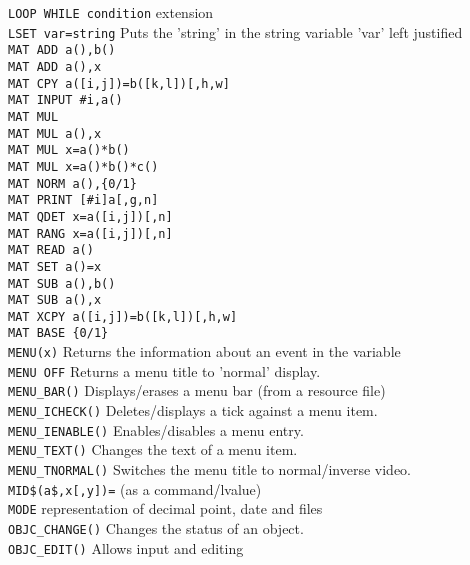 \begin{tabbing}
\verb|LOOP WHILE condition|\>     extension\\
\verb|LSET var=string|\>  Puts the 'string' in the string variable 'var' left justified\\
\verb|MAT ADD a(),b()|\>\\
\verb|MAT ADD a(),x|\>\\
\verb|MAT CPY a([i,j])=b([k,l])[,h,w]|\>\\
\verb|MAT INPUT #i,a()|\>\\
\verb|MAT MUL|\>\\
\verb|MAT MUL a(),x|\>\\
\verb|MAT MUL x=a()*b()|\>\\
\verb|MAT MUL x=a()*b()*c()|\>\\
\verb|MAT NORM a(),{0/1}|\>\\
\verb|MAT PRINT [#i]a[,g,n]|\>\\
\verb|MAT QDET x=a([i,j])[,n]|\>\\
\verb|MAT RANG x=a([i,j])[,n]|\>\\
\verb|MAT READ a()|\>\\
\verb|MAT SET a()=x|\>\\
\verb|MAT SUB a(),b()|\>\\
\verb|MAT SUB a(),x|\>\\
\verb|MAT XCPY a([i,j])=b([k,l])[,h,w]|\>\\
\verb|MAT BASE {0/1}|\>\\
\verb|MENU(x)|\>	      Returns the information about an event in the variable \\
\verb|MENU OFF|\>        Returns a menu title to 'normal' display.\\
\verb|MENU_BAR()|\>      Displays/erases a menu bar (from a resource file)\\
\verb|MENU_ICHECK()|\>   Deletes/displays a tick against a menu item.\\
\verb|MENU_IENABLE()|\>  Enables/disables a menu entry.\\
\verb|MENU_TEXT()|\>     Changes the text of a menu item.\\
\verb|MENU_TNORMAL()|\>  Switches the menu title to normal/inverse video.\\
\verb|MID$(a$,x[,y])=|\> (as a command/lvalue)\\
\verb|MODE|\>	      representation of decimal point, date and files\\
\verb|OBJC_CHANGE()|\>        Changes the status of an object.\\
\verb|OBJC_EDIT()|\>	      Allows input and editing\\

\end{tabbing}
